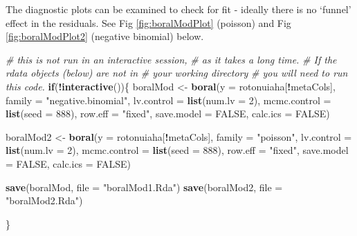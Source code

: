 \documentclass[nofonts,]{tufte-handout}
\newenvironment{Shaded}{\begin{snugshade}}{\end{snugshade}}
\newcommand{\AttributeTok}[1]{\textcolor[rgb]{0.13,0.29,0.53}{#1}}
\newcommand{\CommentTok}[1]{\textcolor[rgb]{0.56,0.35,0.01}{\textit{#1}}}
\newcommand{\ConstantTok}[1]{\textcolor[rgb]{0.56,0.35,0.01}{#1}}
\newcommand{\ControlFlowTok}[1]{\textcolor[rgb]{0.13,0.29,0.53}{\textbf{#1}}}
\newcommand{\DecValTok}[1]{\textcolor[rgb]{0.00,0.00,0.81}{#1}}
\newcommand{\FunctionTok}[1]{\textcolor[rgb]{0.13,0.29,0.53}{\textbf{#1}}}
\newcommand{\NormalTok}[1]{#1}
\newcommand{\OtherTok}[1]{\textcolor[rgb]{0.56,0.35,0.01}{#1}}
\newcommand{\SpecialCharTok}[1]{\textcolor[rgb]{0.81,0.36,0.00}{\textbf{#1}}}
\newcommand{\StringTok}[1]{\textcolor[rgb]{0.31,0.60,0.02}{#1}}
\begin{document}
The diagnostic plots can be examined to check for fit - ideally there is
no `funnel' effect in the residuals. See Fig \ref{fig:boralModPlot}
(poisson) and Fig \ref{fig:boralModPlot2} (negative binomial) below.

\begin{Shaded}
\begin{Highlighting}[]
\CommentTok{\# this is not run in an interactive session, }
\CommentTok{\# as it takes a long time. }
\CommentTok{\# If the rdata objects (below) are not in }
\CommentTok{\# your working directory}
\CommentTok{\# you will need to run this code. }
\ControlFlowTok{if}\NormalTok{(}\SpecialCharTok{!}\FunctionTok{interactive}\NormalTok{())\{}
\NormalTok{  boralMod  }\OtherTok{\textless{}{-}} \FunctionTok{boral}\NormalTok{(}\AttributeTok{y =}\NormalTok{ rotonuiaha[}\SpecialCharTok{!}\NormalTok{metaCols], }
                     \AttributeTok{family =} \StringTok{"negative.binomial"}\NormalTok{, }
                     \AttributeTok{lv.control =} \FunctionTok{list}\NormalTok{(}\AttributeTok{num.lv =} \DecValTok{2}\NormalTok{),}
                     \AttributeTok{mcmc.control =} \FunctionTok{list}\NormalTok{(}\AttributeTok{seed =} \DecValTok{888}\NormalTok{),}
                     \AttributeTok{row.eff =} \StringTok{"fixed"}\NormalTok{,}
                     \AttributeTok{save.model =} \ConstantTok{FALSE}\NormalTok{, }
                     \AttributeTok{calc.ics =} \ConstantTok{FALSE}\NormalTok{)}
  
\NormalTok{  boralMod2  }\OtherTok{\textless{}{-}} \FunctionTok{boral}\NormalTok{(}\AttributeTok{y =}\NormalTok{ rotonuiaha[}\SpecialCharTok{!}\NormalTok{metaCols], }
                      \AttributeTok{family =} \StringTok{"poisson"}\NormalTok{, }
                      \AttributeTok{lv.control =} \FunctionTok{list}\NormalTok{(}\AttributeTok{num.lv =} \DecValTok{2}\NormalTok{),}
                      \AttributeTok{mcmc.control =} \FunctionTok{list}\NormalTok{(}\AttributeTok{seed =} \DecValTok{888}\NormalTok{),}
                      \AttributeTok{row.eff =} \StringTok{"fixed"}\NormalTok{,}
                      \AttributeTok{save.model =} \ConstantTok{FALSE}\NormalTok{, }
                      \AttributeTok{calc.ics =} \ConstantTok{FALSE}\NormalTok{)}
  
  \FunctionTok{save}\NormalTok{(boralMod, }\AttributeTok{file =} \StringTok{"boralMod1.Rda"}\NormalTok{)}
  \FunctionTok{save}\NormalTok{(boralMod2, }\AttributeTok{file =} \StringTok{"boralMod2.Rda"}\NormalTok{)}

\NormalTok{\}}
\end{Highlighting}
\end{Shaded}
\end{document}
